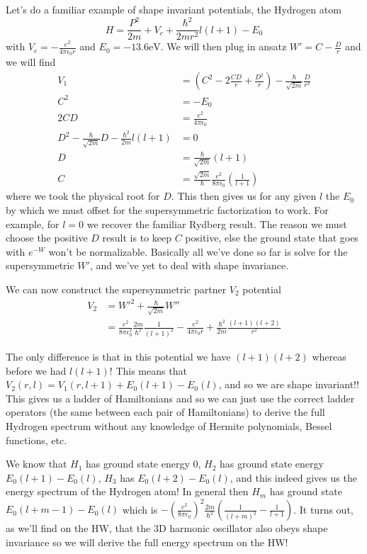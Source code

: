 \documentclass[10pt]{report}
\begin{document}
Let's do a familiar example of shape invariant potentials, the Hydrogen atom
\begin{equation}
    H = \frac{P^2}{2m} + V_c + \frac{\hbar^2}{2mr^2}l(l+1) - E_0
\end{equation}
with $V_c = -\frac{e^2}{4\pi\epsilon_0r}$ and $E_0 = -13.6\mathrm{eV}$. We will then plug in ansatz $W' = C - \frac{D}{r}$ and we will find
\begin{align}
    V_1 &= \left( C^2 - 2\frac{CD}{r} + \frac{D^2}{r} \right) - \frac{\hbar}{\sqrt{2m}}\frac{D}{r^2}\\
    C^2 &= -E_0\\
    2CD &= \frac{e^2}{4\pi\epsilon_0}\\
    D^2 - \frac{\hbar}{\sqrt{2m}}D - \frac{\hbar^2}{2m}l(l+1) &= 0\\
    D &= \frac{\hbar}{\sqrt{2m}}(l+1)\\
    C &= \frac{\sqrt{2m}}{\hbar}\frac{e^2}{8\pi\epsilon_0}\left( \frac{1}{l+1} \right)
\end{align}
where we took the physical root for $D$. This then gives us for any given $l$ the $E_0$ by which we must offset for the supersymmetric factorization to work. For example, for $l=0$ we recover the familiar Rydberg result. The reason we must choose the positive $D$ result is to keep $C$ positive, else the ground state that goes with $e^{-W}$ won't be normalizable. Basically all we've done so far is solve for the supersymmetric $W'$, and we've yet to deal with shape invariance.

We can now construct the supersymmetric partner $V_2$ potential
\begin{align}
    V_2 &= W'^2 + \frac{\hbar}{\sqrt{2m}}W''\\
    &= \frac{e^2}{8\pi\epsilon_0^2}\frac{2m}{\hbar^2}\frac{1}{(l+1)^2} - \frac{e^2}{4\pi\epsilon_0 r} + \frac{\hbar^2}{2m}\frac{(l+1)(l+2)}{r^2}
\end{align}

The only difference is that in this potential we have $(l+1)(l+2)$ whereas before we had $l(l+1)$! This means that $V_2(r,l) = V_1(r, l+1) + E_0(l+1) - E_0(l)$, and so we are shape invariant!! This gives us a ladder of Hamiltonians and so we can just use the correct ladder operators (the same between each pair of Hamiltonians) to derive the full Hydrogen spectrum without any knowledge of Hermite polynomials, Bessel functions, etc.

We know that $H_1$ has ground state energy $0$, $H_2$ has ground state energy $E_0(l+1) - E_0(l)$, $H_3$ has $E_0(l+2) - E_0(l)$, and this indeed gives us the energy spectrum of the Hydrogen atom! In general then $H_m$ has ground state $E_0(l+m-1) - E_0(l)$ which is $-\left( \frac{e^2}{8\pi\epsilon_0} \right)^2\frac{2m}{\hbar^2}\left( \frac{1}{(l+m)^2} - \frac{1}{l+1} \right)$. It turns out, as we'll find on the HW, that the 3D harmonic oscillator also obeys shape invariance so we will derive the full energy spectrum on the HW!
\end{document}
